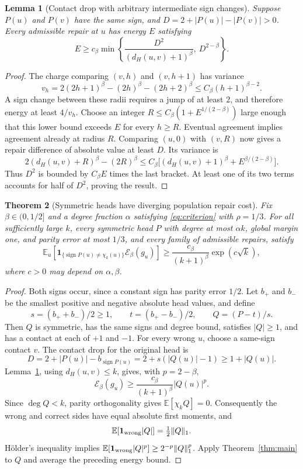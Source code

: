 \documentclass[11pt]{article}
\newtheorem{theorem}{Theorem}
\newtheorem{lemma}[theorem]{Lemma}
\theoremstyle{remark}\newtheorem{remark}[theorem]{Remark}
\newcommand{\E}{\mathbb E}\newcommand{\Prb}{\mathbb P}
\DeclareMathOperator{\sign}{sign}
\begin{document}
\begin{lemma}[Contact drop with arbitrary intermediate sign changes]
\label{lem:contact}
Suppose $P(u)$ and $P(v)$ have the same sign, and
$D=2+|P(u)|-|P(v)|>0$. Every admissible repair at $u$ has energy $E$
satisfying
\[
 E\ge c_\beta\min\left\{
 \frac{D^2}{(d_H(u,v)+1)^\beta},\ D^{2-\beta}\right\}.
\]
\end{lemma}
\begin{proof}
The charge comparing $(v,h)$ and $(v,h+1)$ has variance
\[
 v_h=2(2h+1)^\beta-(2h)^\beta-(2h+2)^\beta
 \le C_\beta(h+1)^{\beta-2}.
\]
A sign change between these radii requires a jump of at least $2$, and
therefore energy at least $4/v_h$. Choose an integer
$R\le C_\beta(1+E^{1/(2-\beta)})$ large enough that this lower bound
exceeds $E$ for every $h\ge R$. Eventual agreement implies agreement
already at radius $R$. Comparing $(u,0)$ with $(v,R)$ now gives a repair
difference of absolute value at least $D$. Its variance is
\[
 2(d_H(u,v)+R)^\beta-(2R)^\beta
 \le C_\beta\bigl[(d_H(u,v)+1)^\beta+E^{\beta/(2-\beta)}\bigr].
\]
Thus $D^2$ is bounded by $C_\beta E$ times the last bracket. At least
one of its two terms accounts for half of $D^2$, proving the result.
\end{proof}

\begin{theorem}[Symmetric heads have diverging population repair cost]
\label{thm:repair}
Fix $\beta\in(0,1/2]$ and a degree fraction $\alpha$ satisfying
\eqref{eq:criterion} with $\rho=1/3$. For all sufficiently large $k$,
every symmetric head $P$ with degree at most $\alpha k$, global margin
one, and parity error at most $1/3$, and every family of admissible
repairs, satisfy
\[
 \E_u\left[\mathbf1_{\{\sign P(u)\ne\chi_k(u)\}}
                  \mathcal E_\beta(g_u)\right]
 \ge \frac{c_\beta}{(k+1)^\beta}\exp(c\sqrt{k}),
\]
where $c>0$ may depend on $\alpha,\beta$.
\end{theorem}
\begin{proof}
Both signs occur, since a constant sign has parity error $1/2$.
Let $b_+$ and $b_-$ be the smallest positive and negative absolute head
values, and define
\[
 s=(b_++b_-)/2\ge1,\qquad t=(b_+-b_-)/2,\qquad Q=(P-t)/s.
\]
Then $Q$ is symmetric, has the same signs and degree bound, satisfies
$|Q|\ge1$, and has a contact at each of $+1$ and $-1$.
For every wrong $u$, choose a same-sign contact $v$. The contact drop
for the original head is
\[
 D=2+|P(u)|-b_{\sign P(u)}=2+s(|Q(u)|-1)\ge1+|Q(u)|.
\]
Lemma~\ref{lem:contact}, using $d_H(u,v)\le k$, gives, with
$p=2-\beta$,
\[
 \mathcal E_\beta(g_u)\ge
 \frac{c_\beta}{(k+1)^\beta}|Q(u)|^p.
\]
Since $\deg Q<k$, parity orthogonality gives $\E[\chi_k Q]=0$.
Consequently the wrong and correct sides have equal absolute first
moments, and
\[
 \E[\mathbf1_{\rm wrong}|Q|]=\tfrac12\|Q\|_1.
\]
H\"older's inequality implies
$\E[\mathbf1_{\rm wrong}|Q|^p]\ge2^{-p}\|Q\|_1^p$.
Apply Theorem~\ref{thm:main} to $Q$ and average the preceding energy
bound.
\end{proof}
\end{document}
